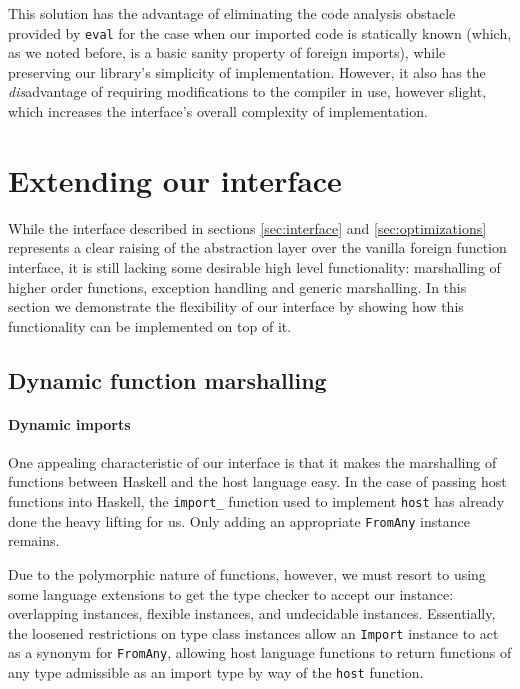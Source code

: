 \documentclass[preprint]{sigplanconf}
\begin{document}
This solution has the advantage of eliminating the code analysis obstacle
provided by \lstinline!eval! for the case when our imported code is statically
known (which, as we noted before, is a basic sanity property of foreign
imports), while preserving our library's simplicity of implementation.
However, it also has the \emph{dis}advantage of requiring modifications to the
compiler in use, however slight, which increases the interface's overall
complexity of implementation.

\section{Extending our interface}
\label{sec:extensions}
While the interface described in sections \ref{sec:interface} and
\ref{sec:optimizations} represents a clear raising of the abstraction layer
over the vanilla foreign function interface, it is still lacking some
desirable high level functionality: marshalling of higher order functions,
exception handling and generic marshalling.
In this section we demonstrate the flexibility of our interface by showing
how this functionality can be implemented on top of it.

\subsection{Dynamic function marshalling}
\label{sec:marshalling-functions}
\paragraph{Dynamic imports}
One appealing characteristic of our interface is that it makes the marshalling
of functions between Haskell and the host language easy. In the case of
passing host functions into Haskell, the \lstinline!import_! function used to
implement \lstinline!host! has already done the heavy lifting for us.
Only adding an appropriate \lstinline!FromAny! instance remains.

Due to the polymorphic nature of functions, however, we must resort to using
some language extensions to get the type checker to accept our instance:
overlapping instances, flexible instances, and undecidable instances.
Essentially, the loosened restrictions on type class instances allow an
\lstinline!Import! instance to act as a synonym for \lstinline!FromAny!,
allowing host language functions to return functions of any type admissible
as an import type by way of the \lstinline!host! function.
\end{document}
